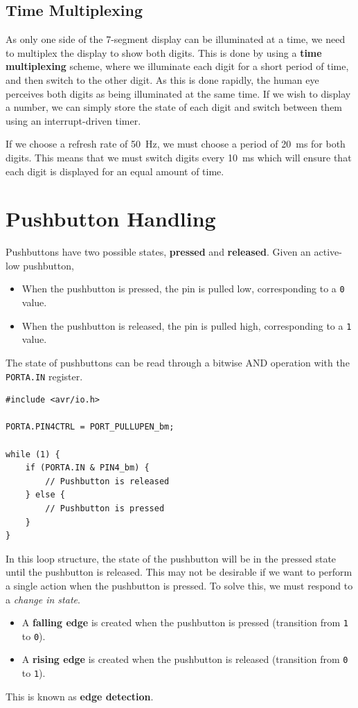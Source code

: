\documentclass{report}
\begin{document}
\subsection{Time Multiplexing}
As only one side of the 7-segment display can be illuminated at a time, we need to multiplex the display to show both digits.
This is done by using a \textbf{time multiplexing} scheme, where we illuminate each digit for a short period of time, and then switch to the other digit.
As this is done rapidly, the human eye perceives both digits as being illuminated at the same time. If we wish to display a number, we can simply
store the state of each digit and switch between them using an interrupt-driven timer.

If we choose a refresh rate of \qty{50}{Hz}, we must choose a period of \qty{20}{ms} for both digits. This means that we must switch digits every \qty{10}{ms}
which will ensure that each digit is displayed for an equal amount of time.
\section{Pushbutton Handling}
Pushbuttons have two possible states, \textbf{pressed} and \textbf{released}. Given an active-low pushbutton,
\begin{itemize}
    \item When the pushbutton is pressed, the pin is pulled low, corresponding to a \texttt{0} value.
    \item When the pushbutton is released, the pin is pulled high, corresponding to a \texttt{1} value.
\end{itemize}
The state of pushbuttons can be read through a bitwise AND operation with the \texttt{PORTA.IN} register.
\begin{verbatim}
#include <avr/io.h>

PORTA.PIN4CTRL = PORT_PULLUPEN_bm;

while (1) {
    if (PORTA.IN & PIN4_bm) {
        // Pushbutton is released
    } else {
        // Pushbutton is pressed
    }
}
\end{verbatim}
In this loop structure, the state of the pushbutton will be in the pressed state until the pushbutton is released.
This may not be desirable if we want to perform a single action when the pushbutton is pressed.
To solve this, we must respond to a \textit{change in state}.
\begin{itemize}
    \item A \textbf{falling edge} is created when the pushbutton is pressed (transition from \texttt{1} to \texttt{0}).
    \item A \textbf{rising edge} is created when the pushbutton is released (transition from \texttt{0} to \texttt{1}).
\end{itemize}
This is known as \textbf{edge detection}.
\end{document}
